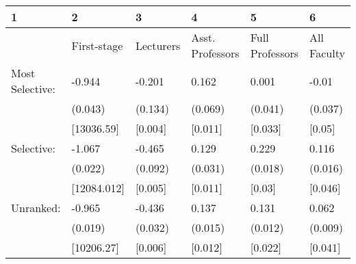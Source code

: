 \begin{tabular}{llllll}
  \hline
1 & 2 & 3 & 4 & 5 & 6 \\ 
  \hline
 & First-stage & Lecturers & Asst. Professors & Full Professors & All Faculty \\ 
  Most Selective: & -0.944 & -0.201 & 0.162 & 0.001 & -0.01 \\ 
   & (0.043) & (0.134) & (0.069) & (0.041) & (0.037) \\ 
   & [13036.59] & [0.004] & [0.011] & [0.033] & [0.05] \\ 
  Selective: & -1.067 & -0.465 & 0.129 & 0.229 & 0.116 \\ 
   & (0.022) & (0.092) & (0.031) & (0.018) & (0.016) \\ 
   & [12084.012] & [0.005] & [0.011] & [0.03] & [0.046] \\ 
  Unranked: & -0.965 & -0.436 & 0.137 & 0.131 & 0.062 \\ 
   & (0.019) & (0.032) & (0.015) & (0.012) & (0.009) \\ 
   & [10206.27] & [0.006] & [0.012] & [0.022] & [0.041] \\ 
   \hline
\end{tabular}
